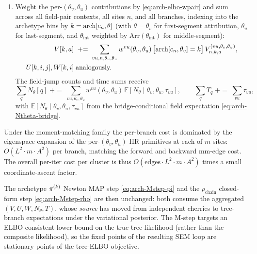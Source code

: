 \begin{enumerate}
\item Weight the per-$(\theta_v, \theta_u)$ contributions by
    \eqref{eq:arch-elbo-wpair} and sum across all field-pair contexts,
    all sites $n$, and all branches, indexing into the archetype bins by
    $k = \mathrm{arch}[c_n, \theta]$ (with $\theta = \theta_v$ for first-segment
    attribution, $\theta_u$ for last-segment, and $\theta_{\mathrm{int}}$
    weighted by $\mathrm{Arr}(\theta_{\mathrm{int}})$ for middle-segment):
    \begin{align}
      V[k, a]
        &\;\mathrel{{+}{=}}\;
        \sum_{vu, n, \theta_v, \theta_u}
          w^{vu}(\theta_v, \theta_u)\,
          \bigl[\mathrm{arch}[c_n, \theta_v] = k\bigr] \,
          V^{(vu, \theta_v, \theta_u)}_{n, k, a}, \\
      U[k, i, j], W[k, i]
        &\;\text{analogously.}
    \end{align}
    The field-jump counts and time sums receive
    \begin{equation}
      \sum_q N_\theta[q] \;\mathrel{{+}{=}}\;
        \sum_{vu, \theta_v, \theta_u} w^{vu}(\theta_v, \theta_u)
        \,\mathbb{E}[N_\theta \mid \theta_v, \theta_u, \tau_{vu}],
      \qquad
      \sum_q T_q \;\mathrel{{+}{=}}\;
        \sum_{vu} \tau_{vu},
      \label{eq:arch-elbo-Nsum-Tsum}
    \end{equation}
    with $\mathbb{E}[N_\theta \mid \theta_v, \theta_u, \tau_{vu}]$ from
    the bridge-conditional field expectation \eqref{eq:arch-Ntheta-bridge}.
\end{enumerate}

Under the moment-matching family the per-branch cost is dominated by
the eigenspace expansion of the per-$(\theta_v, \theta_u)$ HR
primitives at each of $m$ sites: $O(L^2 \cdot m \cdot A^2)$ per
branch, matching the forward and backward mm-edge cost. The overall
per-iter cost per cluster is thus
$O(\text{edges} \cdot L^2 \cdot m \cdot A^2)$ times a small
coordinate-ascent factor.

The archetype $\pi^{(k)}$ Newton MAP step \eqref{eq:arch-Mstep-pi} and
the $\rho_{\text{chain}}$ closed-form step \eqref{eq:arch-Mstep-rho}
are then unchanged: both consume the aggregated $(V, U, W, N_\theta,
T)$, whose \emph{source} has moved from independent cherries to
tree-branch expectations under the variational posterior. The M-step
targets an ELBO-consistent lower bound on the true tree likelihood
(rather than the composite likelihood), so the fixed points of the
resulting SEM loop are stationary points of the tree-ELBO objective.

